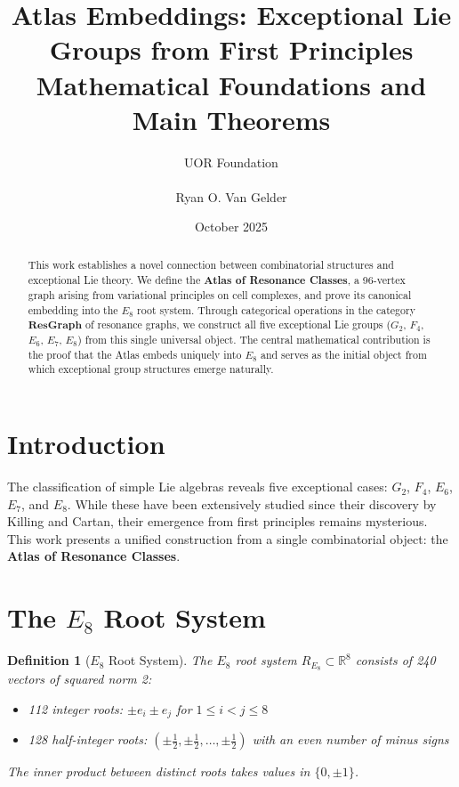 \documentclass[12pt]{article}
\title{Atlas Embeddings: Exceptional Lie Groups from First Principles \\ Mathematical Foundations and Main Theorems}
\author{UOR Foundation \\ \\ Ryan O. Van Gelder} \\
\date{October 2025}
\newtheorem{definition}[theorem]{Definition}
\newcommand{\RR}{\mathbb{R}}
\newcommand{\ResGraph}{\mathbf{ResGraph}}
\begin{document}
\maketitle

\begin{abstract}
This work establishes a novel connection between combinatorial structures and exceptional Lie theory. We define the \textbf{Atlas of Resonance Classes}, a 96-vertex graph arising from variational principles on cell complexes, and prove its canonical embedding into the $E_8$ root system. Through categorical operations in the category $\ResGraph$ of resonance graphs, we construct all five exceptional Lie groups ($G_2$, $F_4$, $E_6$, $E_7$, $E_8$) from this single universal object. The central mathematical contribution is the proof that the Atlas embeds uniquely into $E_8$ and serves as the initial object from which exceptional group structures emerge naturally.
\end{abstract}

\section{Introduction}

The classification of simple Lie algebras reveals five exceptional cases: $G_2$, $F_4$, $E_6$, $E_7$, and $E_8$. While these have been extensively studied since their discovery by Killing and Cartan, their emergence from first principles remains mysterious. This work presents a unified construction from a single combinatorial object: the \textbf{Atlas of Resonance Classes}.

\section{The $E_8$ Root System}

\begin{definition}[$E_8$ Root System]
The $E_8$ root system $R_{E_8} \subset \RR^8$ consists of 240 vectors of squared norm 2:
\begin{itemize}
\item 112 integer roots: $\pm e_i \pm e_j$ for $1 \leq i < j \leq 8$
\item 128 half-integer roots: $(\pm \tfrac12, \pm \tfrac12, \ldots, \pm \tfrac12)$ with an even number of minus signs
\end{itemize}
The inner product between distinct roots takes values in $\{0, \pm1\}$.
\end{definition}
\end{document}
